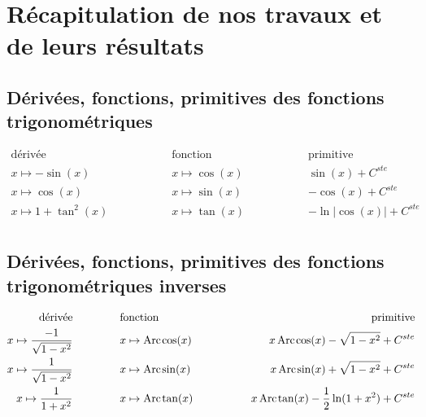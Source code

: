 \documentclass[a4paper,12pt]{report}
\renewcommand{\arcsin}{\mathop{\mathrm{Arc\mspace{2mu}sin}}}
\renewcommand{\arccos}{\mathop{\mathrm{Arc\mspace{2mu}cos}}}
\renewcommand{\arctan}{\mathop{\mathrm{Arc\mspace{2mu}tan}}}
\begin{document}
\chapter{Récapitulation de nos travaux et de leurs résultats}


\section{Dérivées, fonctions, primitives des fonctions trigonométriques}

\begin{align*}
\textrm{dérivée} \hspace{2cm} & \textrm{fonction} \hspace{2cm} & \textrm{primitive}  \\ 
x \mapsto -\sin(x) \hspace{2cm} & x \mapsto \cos(x) \hspace{2cm} & \sin(x) + C^{ste}  \\
x \mapsto \cos(x) \hspace{2cm} & x \mapsto \sin(x) \hspace{2cm} & -\cos(x) + C^{ste}   \\
x \mapsto 1 + \tan\nolimits^2(x) \hspace{2cm} & x \mapsto \tan(x) \hspace{2cm} & -\ln\left| \cos(x)\right| + C^{ste} \\
\end{align*}



\section{Dérivées, fonctions, primitives des fonctions trigonométriques inverses}

\begin{align*}
\textrm{dérivée} \hspace{1.5cm} & \textrm{fonction} \hspace{1.5cm} & \textrm{primitive}  \\ 
x \mapsto \frac{-1}{ \sqrt{1 - x^2}} \hspace{1.5cm} & x \mapsto \arccos(x) \hspace{1.5cm} & x \arccos(x) - \sqrt{1 - x^2 } + C^{ste}  \\
x \mapsto \frac{1}{ \sqrt{1 - x^2}} \hspace{1.5cm} & x \mapsto \arcsin(x) \hspace{1.5cm} & x \arcsin(x) + \sqrt{1 - x^2 } + C^{ste}   \\
x \mapsto \frac{1}{ 1 + x^2} \hspace{1.5cm} & x \mapsto \arctan(x) \hspace{1.5cm} &  x \arctan(x) - \frac{1}{2} \ln( 1 + x^2) + C^{ste} \\
\end{align*}
\end{document}
